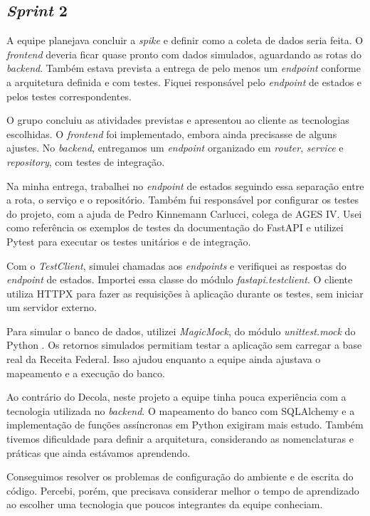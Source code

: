 \subsection{\textit{Sprint} 2}

A equipe planejava concluir a \textit{spike} e definir como a coleta de dados
seria feita. O \textit{frontend} deveria ficar quase pronto com dados simulados,
aguardando as rotas do \textit{backend}. Também estava prevista a entrega de pelo
menos um \textit{endpoint} conforme a arquitetura definida e com testes. Fiquei
responsável pelo \textit{endpoint} de estados e pelos testes correspondentes.

O grupo concluiu as atividades previstas e apresentou ao cliente as tecnologias
escolhidas. O \textit{frontend} foi implementado, embora ainda precisasse de alguns
ajustes. No \textit{backend}, entregamos um \textit{endpoint} organizado em
\textit{router}, \textit{service} e \textit{repository}, com testes de integração.

Na minha entrega, trabalhei no \textit{endpoint} de estados seguindo essa
separação entre a rota, o serviço e o repositório. Também fui responsável por
configurar os testes do projeto, com a ajuda de Pedro Kinnemann Carlucci, colega
de AGES IV. Usei como referência os exemplos de testes da documentação do
FastAPI \cite{fastapi-testing} e utilizei Pytest \cite{pytest-docs} para executar
os testes unitários e de integração.

Com o \textit{TestClient}, simulei chamadas aos \textit{endpoints} e verifiquei
as respostas do \textit{endpoint} de estados. Importei essa classe do módulo
\mbox{\textit{fastapi.testclient}}. O cliente utiliza HTTPX \cite{httpx-docs} para
fazer as requisições à aplicação durante os testes, sem iniciar um servidor externo.

Para simular o banco de dados, utilizei \textit{MagicMock}, do módulo
\mbox{\textit{unittest.mock}} do Python \cite{python-unittest-mock}. Os retornos
simulados permitiam testar a aplicação sem carregar a base real da Receita
Federal. Isso ajudou enquanto a equipe ainda ajustava o mapeamento e a execução
do banco.

Ao contrário do Decola, neste projeto a equipe tinha pouca experiência com a
tecnologia utilizada no \textit{backend}. O mapeamento do banco com SQLAlchemy
e a implementação de funções assíncronas em Python exigiram mais estudo. Também
tivemos dificuldade para definir a arquitetura, considerando as nomenclaturas
e práticas que ainda estávamos aprendendo.

Conseguimos resolver os problemas de configuração do ambiente e de escrita do
código. Percebi, porém, que precisava considerar melhor o tempo de aprendizado
ao escolher uma tecnologia que poucos integrantes da equipe conheciam.
